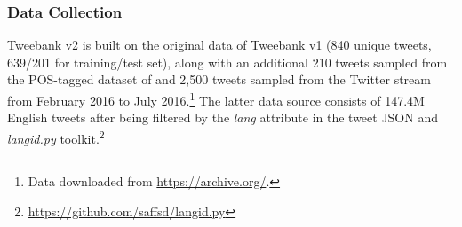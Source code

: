 \documentclass[11pt,a4paper]{article}
\begin{document}
\subsubsection{Data Collection}
{\sc Tweebank v2} is built on the original data of {\sc Tweebank v1}
(840 unique tweets, 639/201 for training/test set), along with an 
additional 210 tweets sampled from the POS-tagged dataset of
 and 2,500 tweets sampled
from the Twitter stream from February 2016 to July 2016.\footnote{Data downloaded from \url{https://archive.org/}.}
The latter data source consists of 147.4M English tweets after being
filtered by the {\it lang} attribute in the tweet JSON and {\it
  langid.py} toolkit.\footnote{\url{https://github.com/saffsd/langid.py}} 

\end{document}
